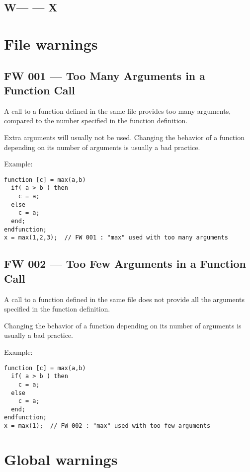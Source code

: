 \documentclass{article}
\begin{document}
\subsection{W--- --- X}


\section{File warnings}

\subsection{FW 001 --- Too Many Arguments in a Function Call}

A call to a function defined in the same file provides too many
arguments, compared to the number specified in the function definition.

Extra arguments will usually not be used. Changing the behavior of a
function depending on its number of arguments is usually a bad
practice.


Example:
\begin{verbatim}
function [c] = max(a,b)
  if( a > b ) then
    c = a;
  else
    c = a;
  end;
endfunction;
x = max(1,2,3);  // FW 001 : "max" used with too many arguments
\end{verbatim}

\subsection{FW 002 --- Too Few Arguments in a Function Call}

A call to a function defined in the same file does not provide all the
arguments specified in the function definition.

Changing the behavior of a function depending on its number of
arguments is usually a bad practice.

Example:
\begin{verbatim}
function [c] = max(a,b)
  if( a > b ) then
    c = a;
  else
    c = a;
  end;
endfunction;
x = max(1);  // FW 002 : "max" used with too few arguments
\end{verbatim}

\section{Global warnings}
\end{document}
